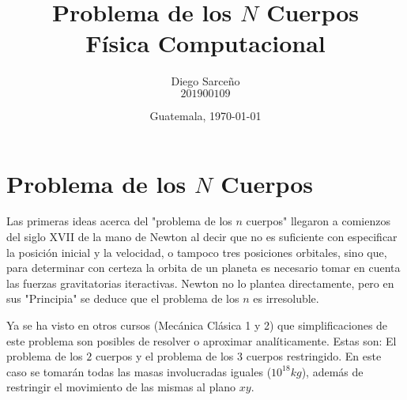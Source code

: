 





\title{\sc Problema de los $N$ Cuerpos \\ \footnotesize{Física Computacional}}%
\author{Diego Sarceño \\ $201900109$}
\date{Guatemala, \today}

  
\maketitle

\begin{abstract}
	\lipsum[1]
\end{abstract}




\section{Problema de los $N$ Cuerpos}
\label{sec:Problema de los $N$ Cuerpos}
\justify
Las primeras ideas acerca del "problema de los $n$ cuerpos" llegaron a comienzos del siglo XVII de la mano de Newton al decir que no es suficiente con especificar la posición inicial y la velocidad, o tampoco tres posiciones orbitales, sino que, para determinar con certeza la orbita de un planeta es necesario tomar en cuenta las fuerzas gravitatorias iteractivas. Newton no lo plantea directamente, pero en sus "Principia" se deduce que el problema de los $n$ es irresoluble.

Ya se ha visto en otros cursos (Mecánica Clásica 1 y 2) que simplificaciones de este problema son posibles de resolver o aproximar analíticamente. Estas son: El problema de los $2$ cuerpos y el problema de los $3$ cuerpos restringido. En este caso se tomarán todas las masas involucradas iguales ($10^{18} kg$), además de restringir el movimiento de las mismas al plano $xy$.









